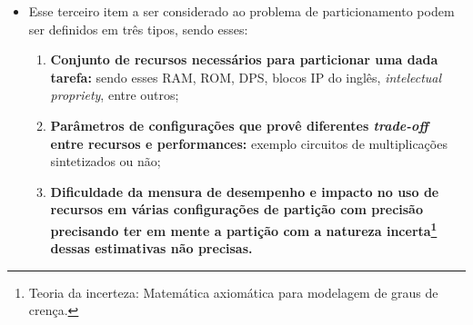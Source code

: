    \begin{frame}{\cite{Wang2016}} \vspace{-1em}
      \begin{itemize}
         \item Esse terceiro item a ser considerado ao problema de particionamento podem ser definidos em três tipos, sendo esses:
         \begin{enumerate}
            \setlength{\itemsep}{1.5em}
            \item \textbf{Conjunto de recursos necessários para particionar uma dada tarefa:} sendo esses RAM, ROM, DPS, blocos IP do inglês, \textit{intelectual propriety}, entre outros; 
            \item \textbf{Parâmetros de configurações que provê diferentes \textit{trade-off} entre recursos e performances:} exemplo circuitos de multiplicações sintetizados ou não;
            \item \textbf{Dificuldade da mensura de desempenho e impacto no uso de recursos em várias configurações de partição com precisão precisando ter em mente a partição com a natureza incerta\footnote{Teoria da incerteza: Matemática axiomática para modelagem de graus de crença.} dessas estimativas não precisas.}
         \end{enumerate}
      \end{itemize}
   \end{frame}

   
